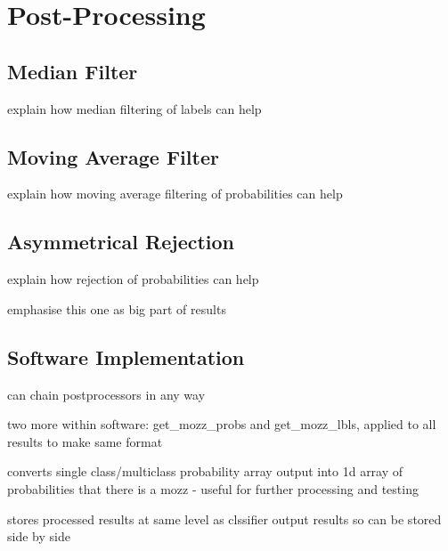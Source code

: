 \section{Post-Processing}
\label{sec:pl-postproc}

    \subsection{Median Filter}
    \label{subsec:pl-postproc-med}
        \begin{sitemize}
            \item{explain how median filtering of labels can help}
        \end{sitemize}
        
    \subsection{Moving Average Filter}
    \label{subsec:pl-postproc-avg}
        \begin{sitemize}
            \item{explain how moving average filtering of probabilities can help}
        \end{sitemize}
        
    \subsection{Asymmetrical Rejection}
    \label{subsec:pl-postproc-rej}
        \begin{sitemize}
            \item{explain how rejection of probabilities can help}
            \item{emphasise this one as big part of results}
        \end{sitemize}
        
    \subsection{Software Implementation}
    \label{subsec:pl-postproc-software}
        \begin{sitemize}
            \item{can chain postprocessors in any way}
            \item{two more within software: get\_mozz\_probs and get\_mozz\_lbls, applied to all results to make same format}
            \item{converts single class/multiclass probability array output into 1d array of probabilities that there is a mozz - useful for further processing and testing}
            \item{stores processed results at same level as clssifier output results so can be stored side by side}
        \end{sitemize} 
